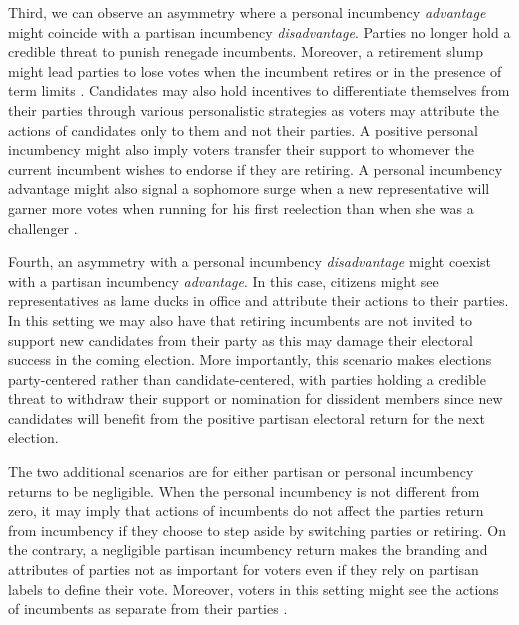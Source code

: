  Third, we can observe an asymmetry where a personal incumbency \emph{advantage} might coincide with a partisan incumbency \emph{disadvantage}. Parties no longer hold a credible threat to punish renegade incumbents. Moreover, a retirement slump might lead parties to lose votes when the incumbent retires \citep{alford_brady_1989} or in the presence of term limits \citep{ansolabehere_snyder_2004}. Candidates may also hold incentives to differentiate themselves from their parties through various personalistic strategies as voters may attribute the actions of candidates only to them and not their parties. A positive personal incumbency might also imply voters transfer their support to whomever the current incumbent wishes to endorse if they are retiring. A personal incumbency advantage might also signal a sophomore surge when a new representative will garner more votes when running for his first reelection than when she was a challenger \citep{erikson_1971, alford_brady_1989}. 
  
 
 Fourth, an asymmetry with a personal incumbency \emph{disadvantage} might coexist with a partisan incumbency \emph{advantage}. In this case, citizens might see representatives as lame ducks in office and attribute their actions to their parties. In this setting we may also have that retiring incumbents are not invited to support new candidates from their party as this may damage their electoral success in the coming election. More importantly, this scenario makes elections party-centered rather than candidate-centered, with parties holding a credible threat to withdraw their support or nomination for dissident members since new candidates will benefit from the positive partisan electoral return for the next election.  

The two additional scenarios are for either partisan or personal incumbency returns to be negligible. When the personal incumbency is not different from zero, it may imply that actions of incumbents do not affect the parties return from incumbency if they choose to step aside by switching parties or retiring. On the contrary, a negligible partisan incumbency return makes the branding and attributes of parties not as important for voters even if they rely on partisan labels to define their vote. Moreover, voters in this setting might see the actions of incumbents as separate from their parties \citep{fowler_hall_2014}. 

